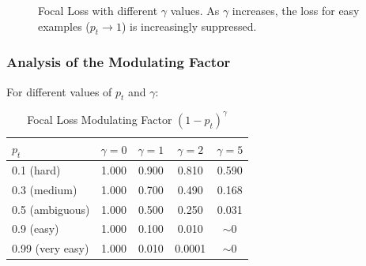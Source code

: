 \begin{figure}[htbp]
    \centering
    \caption[Focal loss modulation]{Focal Loss with different $\gamma$ values. As $\gamma$ increases, the loss for easy examples ($p_t \to 1$) is increasingly suppressed.}
    \label{fig:focal_loss}
\end{figure}

\subsubsection{Analysis of the Modulating Factor}

For different values of $p_t$ and $\gamma$:

\begin{table}[ht]
    \centering
    \caption{Focal Loss Modulating Factor $(1 - p_t)^\gamma$}
    \begin{tabular}{L{2.5cm} c c c c}
        \toprule
        $p_t$ & $\gamma = 0$ & $\gamma = 1$ & $\gamma = 2$ & $\gamma = 5$ \\
         (hard) & 1.000 & 0.900 & 0.810 & 0.590 \\
        0.3 (medium) & 1.000 & 0.700 & 0.490 & 0.168 \\
        0.5 (ambiguous) & 1.000 & 0.500 & 0.250 & 0.031 \\
        0.9 (easy) & 1.000 & 0.100 & 0.010 & $\sim$0 \\
        0.99 (very easy) & 1.000 & 0.010 & 0.0001 & $\sim$0 \\
        \bottomrule
    \end{tabular}
\end{table}

